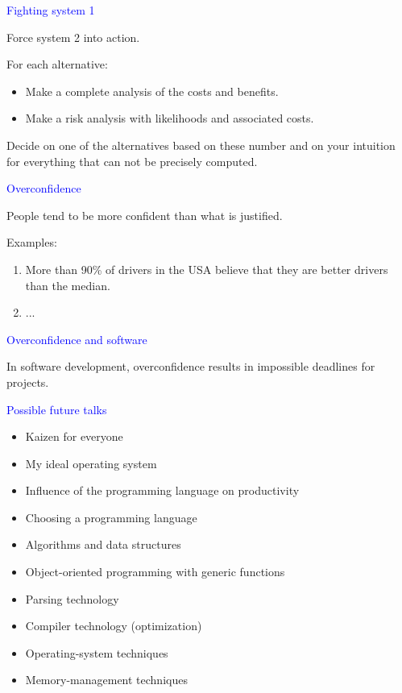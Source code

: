 \documentclass{slides}
\newcommand{\ti}[1]{\begin{center}\Large{\textcolor{blue}{#1}}\end{center}}
\begin{document}
\begin{slide}\ti{Fighting system 1}

Force system 2 into action.

For each alternative:

\begin{itemize}
\item Make a complete analysis of the costs and benefits.
\item Make a risk analysis with likelihoods and associated costs.
\end{itemize}

Decide on one of the alternatives based on these number and on your
intuition for everything that can not be precisely computed.

\vfill\end{slide}
\begin{slide}\ti{Overconfidence}

People tend to be more confident than what is justified.

Examples:

\begin{enumerate}
\item More than 90\% of drivers in the USA believe that they are
  better drivers than the median.
\item ...
\end{enumerate}

\vfill\end{slide}
\begin{slide}\ti{Overconfidence and software}

In software development, overconfidence results in impossible
deadlines for projects.

\vfill\end{slide}
\begin{slide}\ti{Possible future talks}

{\small
  \begin{itemize}
  \item Kaizen for everyone
  \item My ideal operating system
  \item Influence of the programming language on productivity
  \item Choosing a programming language
  \item Algorithms and data structures
  \item Object-oriented programming with generic functions
  \item Parsing technology
  \item Compiler technology (optimization)
  \item Operating-system techniques
  \item Memory-management techniques
  \end{itemize}}

\vfill\end{slide}
\end{document}

